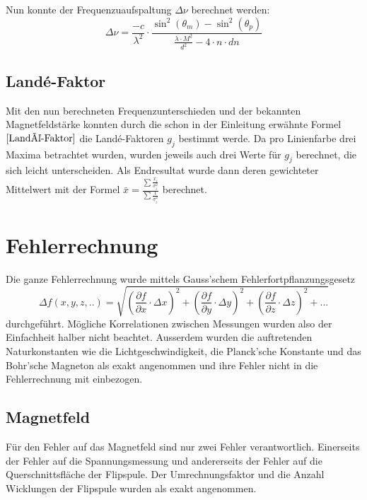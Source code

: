\documentclass[a4paper,parskip,11pt, DIV12]{scrreprt}
\begin{document}
Nun konnte der Frequenzuaufspaltung $\Delta \nu$ berechnet werden:
	\begin{equation}
	\label{Frequenzunterschied}
	\Delta \nu = \frac{-c}{\lambda^2}\cdot\frac{\sin^2(\theta_m)-\sin^2(\theta_p)}{\frac{\lambda \cdot M^2}{d^2}-4\cdot n \cdot dn}
	\end{equation}
	
	\section{Landé-Faktor}
	
	Mit den nun berechneten Frequenzunterschieden und der bekannten Magnetfeldstärke konnten durch die schon in der Einleitung erwähnte Formel $\eqref{Landé-Faktor}$ die Landé-Faktoren $g_j$ bestimmt werde. Da pro Linienfarbe drei Maxima betrachtet wurden, wurden jeweils auch drei Werte für $g_j$ berechnet, die sich leicht unterscheiden. Als Endresultat wurde dann deren gewichteter Mittelwert mit der Formel  $\bar{x} = \frac{\sum\frac{x_i}{\sigma_i^2}}{\sum \frac{1}{\sigma_i^2}}$ berechnet. 
 
	 
	\chapter{Fehlerrechnung}
	Die ganze Fehlerrechnung wurde mittels Gauss'schem Fehlerfortpflanzungsgesetz 
	\begin{equation}
	\label{Fehlerfortpflanzungsgesetz}
	\Delta f(x,y,z,..) = \sqrt{(\frac{\partial f}{\partial x} \cdot \Delta x)^2+(\frac{\partial f}{\partial y} \cdot \Delta y)^2+(\frac{\partial f}{\partial z} \cdot \Delta z)^2+...}
	\end{equation}
	durchgeführt. Mögliche Korrelationen zwischen Messungen wurden also der Einfachheit halber nicht beachtet. Ausserdem wurden die auftretenden Naturkonstanten wie die Lichtgeschwindigkeit, die Planck'sche Konstante und das Bohr'sche Magneton als exakt angenommen und ihre Fehler nicht in die Fehlerrechnung mit einbezogen.  
	\section{Magnetfeld}
	Für den Fehler auf das Magnetfeld sind nur zwei Fehler verantwortlich. Einerseits der Fehler auf die Spannungsmessung und andererseits der Fehler auf die Querschnittsfläche der Flipspule. Der Umrechnungsfaktor und die Anzahl Wicklungen der Flipspule wurden als exakt angenommen. 
	
\end{document}
